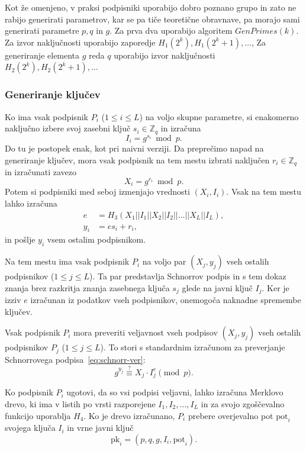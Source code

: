 \documentclass[isrm2, tisk]{fmfdelo}
\newcommand{\Z}{\mathbb Z}
\begin{document}
Kot že omenjeno, v praksi podpisniki uporabijo dobro poznano grupo in zato ne rabijo generirati
parametrov, kar se pa tiče teoretične obravnave, pa morajo sami generirati parametre $p, q$ in $g$.
Za prva dva uporabijo algoritem $GenPrimes(k)$. Za izvor naključnosti uporabijo zaporedje $H_1(2^k),
H_1(2^k + 1), \dots$, Za generiranje elementa $g$ reda $q$ uporabijo izvor naključnosti
$H_2(2^k), H_2(2^k + 1), \dots$

\subsubsection{Generiranje ključev}
Ko ima vsak podpisnik $P_i$ ($1 \le i \le L$) na voljo skupne parametre, si enakomerno naključno
izbere svoj zasebni ključ $s_i \in \Z_q$ in izračuna
$$ 
I_i = g^{s_i} \bmod p.
$$
Do tu je postopek enak, kot pri naivni verziji. Da preprečimo napad na generiranje ključev, mora
vsak podpisnik na tem mestu izbrati naključen $r_i \in \Z_q$ in izračunati zavezo
$$
X_i = g^{r_i} \bmod p.
$$
Potem si podpisniki med seboj izmenjajo vrednosti $(X_i, I_i)$. Vsak na tem mestu lahko izračuna
\begin{align*}
    e &= H_3(X_1 || I_1 || X_2 || I_2 || \dots || X_L || I_L), \\
    y_i &= e s_i + r_i,
\end{align*}
in pošlje $y_i$ vsem ostalim podpisnikom.

Na tem mestu ima vsak podpisnik $P_i$ na voljo par $(X_j, y_j)$ vseh ostalih podpisnikov ($1 \le j
\le L$). Ta par predstavlja Schnorrov podpis in s tem dokaz znanja brez razkritja znanja zasebnega
ključa $s_j$ glede na javni ključ $I_j$. Ker je izziv $e$ izračunan iz podatkov vseh podpisnikov,
onemogoča naknadne spremembe ključev. 

Vsak podpisnik $P_i$ mora preveriti veljavnost vseh podpisov $(X_j, y_j)$ vseh ostalih podpisnikov
$P_j$ ($1 \le j \le L$). To stori s standardnim izračunom za preverjanje Schnorrovega
podpisa~\eqref{eq:schnorr-ver}:
$$
g^{y_j} \stackrel{?}{\equiv} X_j \cdot I_j^{e} \pmod p.
$$

Ko podpisnik $P_i$ ugotovi, da so vsi podpisi veljavni, lahko izračuna Merklovo drevo, ki ima v
listih po vrsti razporejene $I_1, I_2, \dots, I_L$ in za svojo zgoščevalno funkcijo uporablja $H_4$.
Ko je drevo izračunano, $P_i$ prebere overjevalno pot $\text{pot}_i$ svojega ključa $I_i$ in vrne
javni ključ
$$ 
\text{pk}_i = (p, q, g, I_i, \text{pot}_i).
$$
\end{document}
